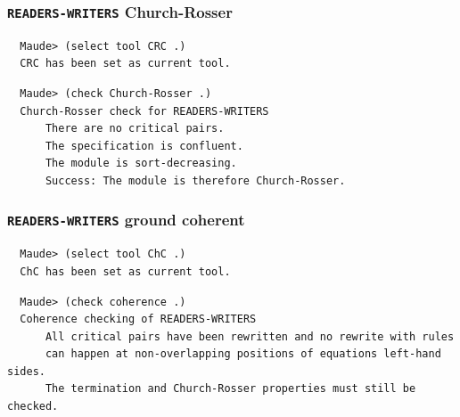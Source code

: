 \documentclass[xcolor=dvipsnames,10pt]{beamer}
\begin{document}
\begin{frame}[fragile]
  \frametitle{\verb~READERS-WRITERS~ Church-Rosser}

\begin{scriptsize}
\begin{verbatim}
  Maude> (select tool CRC .)
  CRC has been set as current tool.
\end{verbatim}
\end{scriptsize}

\begin{scriptsize}
\begin{verbatim}
  Maude> (check Church-Rosser .)
  Church-Rosser check for READERS-WRITERS
      There are no critical pairs.
      The specification is confluent.
      The module is sort-decreasing.
      Success: The module is therefore Church-Rosser.
\end{verbatim}
\end{scriptsize}

\end{frame}
\begin{frame}[fragile]
  \frametitle{\verb~READERS-WRITERS~ ground coherent}

\begin{scriptsize}
\begin{verbatim}
  Maude> (select tool ChC .)
  ChC has been set as current tool.
\end{verbatim}
\end{scriptsize}

\begin{scriptsize}
\begin{verbatim}
  Maude> (check coherence .)
  Coherence checking of READERS-WRITERS
      All critical pairs have been rewritten and no rewrite with rules 
      can happen at non-overlapping positions of equations left-hand sides.
      The termination and Church-Rosser properties must still be checked.
\end{verbatim}
\end{scriptsize}

\end{frame}
\end{document}
